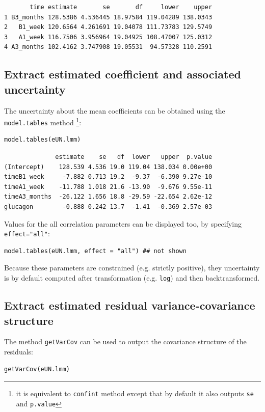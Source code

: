 \documentclass[12pt]{article}
\begin{document}
\begin{verbatim}
       time estimate       se       df     lower    upper
1 B3_months 128.5386 4.536445 18.97584 119.04289 138.0343
2   B1_week 120.6564 4.261691 19.04078 111.73783 129.5749
3   A1_week 116.7506 3.956964 19.04925 108.47007 125.0312
4 A3_months 102.4162 3.747908 19.05531  94.57328 110.2591
\end{verbatim}

\subsection{Extract estimated coefficient and associated uncertainty}
\label{sec:org674e36d}

The uncertainty about the mean coefficients can be obtained using the
\texttt{model.tables} method \footnote{it is equivalent to \texttt{confint} method
except that by default it also outputs \texttt{se} and \texttt{p.value}}:
\lstset{language=r,label= ,caption= ,captionpos=b,numbers=none}
\begin{lstlisting}
model.tables(eUN.lmm)
\end{lstlisting}

\begin{verbatim}
              estimate    se   df  lower   upper  p.value
(Intercept)    128.539 4.536 19.0 119.04 138.034 0.00e+00
timeB1_week     -7.882 0.713 19.2  -9.37  -6.390 9.27e-10
timeA1_week    -11.788 1.018 21.6 -13.90  -9.676 9.55e-11
timeA3_months  -26.122 1.656 18.8 -29.59 -22.654 2.62e-12
glucagon        -0.888 0.242 13.7  -1.41  -0.369 2.57e-03
\end{verbatim}


Values for the all correlation parameters can be displayed
too, by specifying \texttt{effect="all"}:
\lstset{language=r,label= ,caption= ,captionpos=b,numbers=none}
\begin{lstlisting}
model.tables(eUN.lmm, effect = "all") ## not shown
\end{lstlisting}

Because these parameters are constrained (e.g. strictly positive),
they uncertainty is by default computed after transformation
(e.g. \texttt{log}) and then backtransformed. 

\subsection{Extract estimated residual variance-covariance structure}
\label{sec:org45ea9ca}

The method \texttt{getVarCov} can be used to output the covariance structure of the residuals:
\lstset{language=r,label= ,caption= ,captionpos=b,numbers=none}
\begin{lstlisting}
getVarCov(eUN.lmm)
\end{lstlisting}
\end{document}
